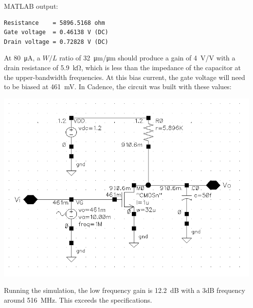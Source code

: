 \documentclass{homework}
\begin{document}
\noindent MATLAB output:
\begin{lstlisting}
Resistance    = 5896.5168 ohm
Gate voltage  = 0.46138 V (DC)
Drain voltage = 0.72828 V (DC)
\end{lstlisting}
	\pagebreak
	At \SI{80}{\micro\ampere}, a $W/L$ ratio of \SI{32}{\um/\um} should produce a gain of \SI{4}{\V/\V} with a drain resistance of \SI{5.9}{\kohm}, which is less than the impedance of the capacitor at the upper-bandwidth frequencies. At this bias current, the gate voltage will need to be biased at \SI{461}{\mV}. In Cadence, the circuit was built with these values: \begin{center}
		\includegraphics[width=0.7\linewidth]{hw5_ckt}
	\end{center}
	Running the simulation, the low frequency gain is \SI{12.2}{\dB} with a 3dB frequency around \SI{516}{\MHz}. This exceeds the specifications. 
	
\end{document}
